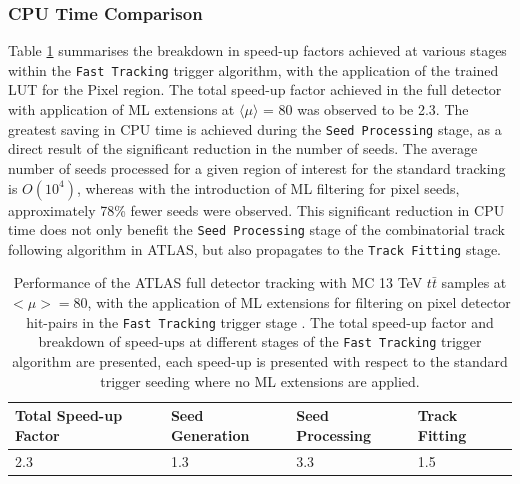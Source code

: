 \subsubsection{CPU Time Comparison}


Table \ref{tab:cpu} summarises the breakdown in speed-up factors achieved at various stages within the \texttt{Fast Tracking} trigger algorithm, with the application of the trained LUT for the Pixel region. The total speed-up factor achieved in the full detector with application of ML extensions at $\langle \mu \rangle$ = 80 was observed to be 2.3. The greatest saving in CPU time is achieved during the \texttt{Seed Processing} stage, as a direct result of the significant reduction in the number of seeds. The average number of seeds processed for a given region of interest for the standard tracking is $O(10^{4})$, whereas with the introduction of ML filtering for pixel seeds, approximately 78\% fewer seeds were observed. This significant reduction in CPU time does not only benefit the \texttt{Seed Processing} stage of the combinatorial track following algorithm in ATLAS, but also propagates to the \texttt{Track Fitting} stage.

\begin{table}[htb!]
\caption{Performance of the ATLAS full detector tracking with MC 13 TeV $t\bar{t}$ samples at $<\mu> = 80$, with the application of ML extensions for filtering on pixel detector hit-pairs in the \texttt{Fast Tracking} trigger stage \cite{public-hlt}. The total speed-up factor and breakdown of speed-ups at different stages of the \texttt{Fast Tracking} trigger algorithm are presented, each speed-up is presented with respect to the standard trigger seeding where no ML extensions are applied.}
\begin{center}
\begin{tabular}{llll}
\toprule
Total Speed-up Factor & Seed Generation & Seed Processing & Track Fitting \\
\hline
2.3 & 1.3 & 3.3 & 1.5 \\ 
\bottomrule
\end{tabular}
\end{center}
\label{tab:cpu}
\end{table}

